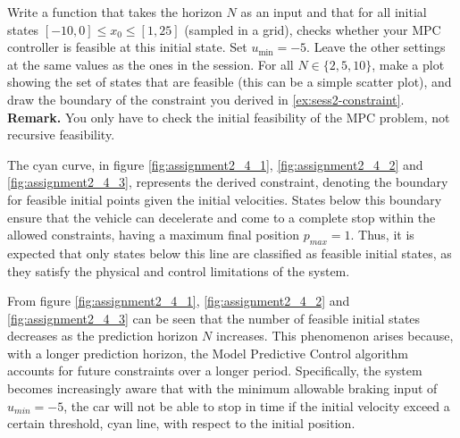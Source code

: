 \documentclass[]{article}
\begin{document}
\begin{assignment} \label{ex:extra-1}
	Write a function that takes the horizon $N$ as an input and that 
	for all initial states $[-10, 0] \leq x_0 \leq [1, 25]$ (sampled in a grid), checks whether your MPC controller is feasible at this initial state.
	Set $u_{\min} = -5$.
	Leave the other settings at the same values as the ones in the session.
	For all $N \in \{2, 5, 10\}$, make a plot showing the set of states that are feasible (this can be a simple scatter plot), 
	and draw the boundary of the constraint you derived in \cref{ex:sess2-constraint}. 
	\textbf{Remark.} You only have to check the initial feasibility of the MPC problem, not recursive feasibility.
\end{assignment}
\begin{flushleft}
	The cyan curve, in figure \ref{fig:assignment2_4_1}, \ref{fig:assignment2_4_2} and \ref{fig:assignment2_4_3}, represents the derived constraint, denoting the boundary for feasible initial points given the initial velocities. 
	States below this boundary ensure that the vehicle can decelerate and come to a complete stop within the allowed constraints, having a maximum final position $p_{max}=1$. 
	Thus, it is expected that only states below this line are classified as feasible initial states, as they satisfy the physical and control limitations of the system.
\end{flushleft}
From figure \ref{fig:assignment2_4_1}, \ref{fig:assignment2_4_2} and \ref{fig:assignment2_4_3} can be seen that the number of feasible initial states decreases as the prediction horizon $N$ increases. 
This phenomenon arises because, with a longer prediction horizon, the Model Predictive Control algorithm accounts for future constraints over a longer period. 
Specifically, the system becomes increasingly aware that with the minimum allowable braking input of $u_{min}=-5$, the car will not be able to stop in time if the initial velocity exceed a certain threshold, cyan line, with respect to the initial position.
\end{document}
